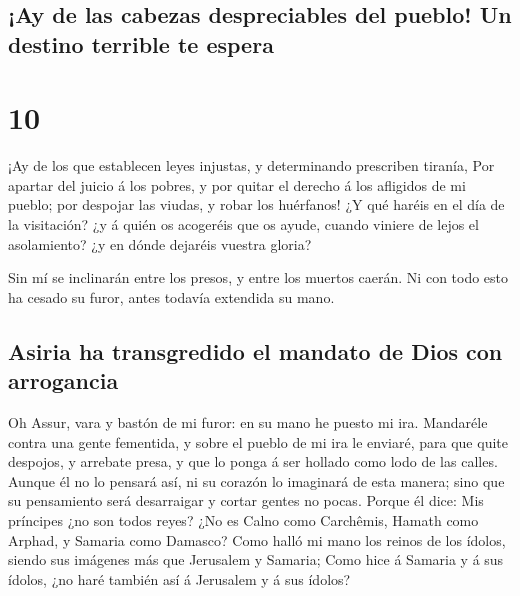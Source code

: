 \hypertarget{ay-de-las-cabezas-despreciables-del-pueblo-un-destino-terrible-te-espera}{%
\subsection{¡Ay de las cabezas despreciables del pueblo! Un destino
terrible te
espera}\label{ay-de-las-cabezas-despreciables-del-pueblo-un-destino-terrible-te-espera}}

\hypertarget{section-9}{%
\section{10}\label{section-9}}

 ¡Ay de los que establecen leyes injustas, y determinando
prescriben tiranía,  Por apartar del juicio á los pobres,
y por quitar el derecho á los afligidos de mi pueblo; por despojar las
viudas, y robar los huérfanos!  ¿Y qué haréis en el día de
la visitación? ¿y á quién os acogeréis que os ayude, cuando viniere de
lejos el asolamiento? ¿y en dónde dejaréis vuestra gloria?

 Sin mí se inclinarán entre los presos, y entre los
muertos caerán. Ni con todo esto ha cesado su furor, antes todavía
extendida su mano.

\hypertarget{asiria-ha-transgredido-el-mandato-de-dios-con-arrogancia}{%
\subsection{Asiria ha transgredido el mandato de Dios con
arrogancia}\label{asiria-ha-transgredido-el-mandato-de-dios-con-arrogancia}}

 Oh Assur, vara y bastón de mi furor: en su mano he puesto
mi ira.  Mandaréle contra una gente fementida, y sobre el
pueblo de mi ira le enviaré, para que quite despojos, y arrebate presa,
y que lo ponga á ser hollado como lodo de las calles. 
Aunque él no lo pensará así, ni su corazón lo imaginará de esta manera;
sino que su pensamiento será desarraigar y cortar gentes no pocas.
 Porque él dice: Mis príncipes ¿no son todos reyes?
 ¿No es Calno como Carchêmis, Hamath como Arphad, y
Samaria como Damasco?  Como halló mi mano los reinos de
los ídolos, siendo sus imágenes más que Jerusalem y Samaria;
 Como hice á Samaria y á sus ídolos, ¿no haré también así
á Jerusalem y á sus ídolos?

